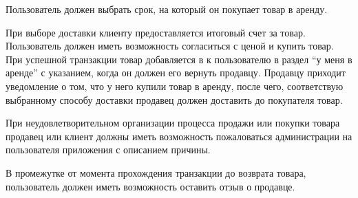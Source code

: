 Пользователь должен выбрать срок, на который он покупает товар в аренду.

При выборе доставки клиенту предоставляется итоговый счет за товар.
Пользователь должен иметь возможность согласиться с ценой и купить товар.
При успешной транзакции товар добавляется в к пользователю в раздел “у меня в аренде” с указанием, когда он должен его вернуть продавцу.
Продавцу приходит уведомление о том, что у него купили товар в аренду, после чего, соответствую выбранному способу доставки продавец должен доставить до покупателя товар.

При неудовлетворительном организации процесса продажи или покупки товара продавец или клиент должны иметь возможность пожаловаться администрации на пользователя приложения с описанием причины.

В промежутке от момента прохождения транзакции до возврата товара, пользователь должен иметь возможность оставить отзыв о продавце.

